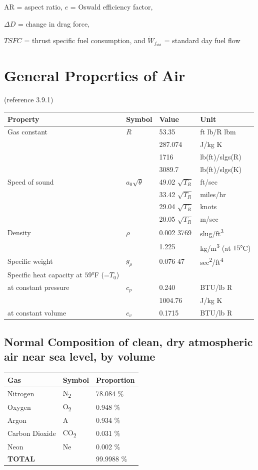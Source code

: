 \documentclass[
]{book}
\begin{document}
\(\mathrm{AR}\) = aspect ratio, \(e\) = Oswald efficiency factor,

\(\Delta D\) = change in drag force,

\(TSFC\) = thrust specific fuel consumption, and
\(\dot{W}_{f_{\mathrm{std}}}\) = standard day fuel flow

\hypertarget{general-properties-of-air}{%
\section{General Properties of Air}\label{general-properties-of-air}}

(reference 3.9.1)

\begin{longtable}[]{@{}llll@{}}
\toprule
Property & Symbol & Value & Unit\tabularnewline
\midrule
\endhead
Gas constant & \(R\) & 53.35 & ft lb/R lbm\tabularnewline
& & 287.074 & J/kg K\tabularnewline
& & 1716 & lb(ft)/slgs(R)\tabularnewline
& & 3089.7 & lb(ft)/slgs(K)\tabularnewline
Speed of sound & \(a_0 \sqrt{\theta}\) & 49.02 \(\sqrt{T_R}\) & ft/sec\tabularnewline
& & 33.42 \(\sqrt{T_R}\) & miles/hr\tabularnewline
& & 29.04 \(\sqrt{T_R}\) & knots\tabularnewline
& & 20.05 \(\sqrt{T_R}\) & m/sec\tabularnewline
Density & \(\rho\) & 0.002 3769 & slug/ft\textsuperscript{3}\tabularnewline
& & 1.225 & kg/m\textsuperscript{3} (at \(15°\)C)\tabularnewline
Specific weight & \(g_\rho\) & 0.076 47 & sec\textsuperscript{2}/ft\textsuperscript{4}\tabularnewline
Specific heat capacity at \(59°\)F (=\(T_0\)) & & &\tabularnewline
at constant pressure & \(c_p\) & 0.240 & BTU/lb R\tabularnewline
& & 1004.76 & J/kg K\tabularnewline
at constant volume & \(c_v\) & 0.1715 & BTU/lb R\tabularnewline
\bottomrule
\end{longtable}

\hypertarget{normal-composition-of-clean-dry-atmospheric-air-near-sea-level-by-volume}{%
\subsection*{Normal Composition of clean, dry atmospheric air near sea level, by volume}\label{normal-composition-of-clean-dry-atmospheric-air-near-sea-level-by-volume}}

\begin{longtable}[]{@{}lll@{}}
\toprule
Gas & Symbol & Proportion\tabularnewline
\midrule
\endhead
Nitrogen & N\textsubscript{2} & 78.084 \%\tabularnewline
Oxygen & O\textsubscript{2} & 0.948 \%\tabularnewline
Argon & A & 0.934 \%\tabularnewline
Carbon Dioxide & CO\textsubscript{2} & 0.031 \%\tabularnewline
Neon & Ne & 0.002 \%\tabularnewline
\textbf{TOTAL} & & 99.9988 \%\tabularnewline
\bottomrule
\end{longtable}
\end{document}

